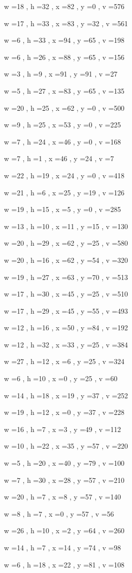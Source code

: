 \documentclass[11pt]{article}
\begin{document}
w =18 , h =32 , x =82 , y =0 , v =576
\par
w =17 , h =33 , x =83 , y =32 , v =561
\par
w =6 , h =33 , x =94 , y =65 , v =198
\par
w =6 , h =26 , x =88 , y =65 , v =156
\par
w =3 , h =9 , x =91 , y =91 , v =27
\par
w =5 , h =27 , x =83 , y =65 , v =135
\par
w =20 , h =25 , x =62 , y =0 , v =500
\par
w =9 , h =25 , x =53 , y =0 , v =225
\par
w =7 , h =24 , x =46 , y =0 , v =168
\par
w =7 , h =1 , x =46 , y =24 , v =7
\par
w =22 , h =19 , x =24 , y =0 , v =418
\par
w =21 , h =6 , x =25 , y =19 , v =126
\par
w =19 , h =15 , x =5 , y =0 , v =285
\par
w =13 , h =10 , x =11 , y =15 , v =130
\par
w =20 , h =29 , x =62 , y =25 , v =580
\par
w =20 , h =16 , x =62 , y =54 , v =320
\par
w =19 , h =27 , x =63 , y =70 , v =513
\par
w =17 , h =30 , x =45 , y =25 , v =510
\par
w =17 , h =29 , x =45 , y =55 , v =493
\par
w =12 , h =16 , x =50 , y =84 , v =192
\par
w =12 , h =32 , x =33 , y =25 , v =384
\par
w =27 , h =12 , x =6 , y =25 , v =324
\par
w =6 , h =10 , x =0 , y =25 , v =60
\par
w =14 , h =18 , x =19 , y =37 , v =252
\par
w =19 , h =12 , x =0 , y =37 , v =228
\par
w =16 , h =7 , x =3 , y =49 , v =112
\par
w =10 , h =22 , x =35 , y =57 , v =220
\par
w =5 , h =20 , x =40 , y =79 , v =100
\par
w =7 , h =30 , x =28 , y =57 , v =210
\par
w =20 , h =7 , x =8 , y =57 , v =140
\par
w =8 , h =7 , x =0 , y =57 , v =56
\par
w =26 , h =10 , x =2 , y =64 , v =260
\par
w =14 , h =7 , x =14 , y =74 , v =98
\par
w =6 , h =18 , x =22 , y =81 , v =108
\par
\newpage
\end{document}
